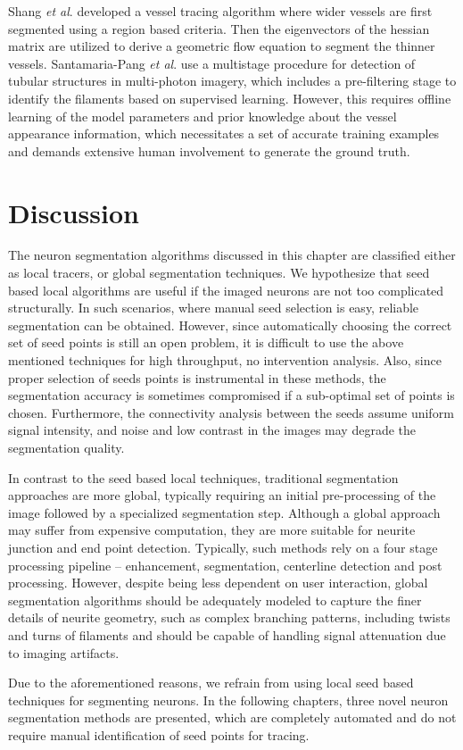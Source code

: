 Shang \textit{et al}. \cite{shang2011vascular} developed a vessel tracing algorithm where wider vessels are first segmented using a region based criteria. Then the eigenvectors of the hessian matrix are utilized to derive a geometric flow equation to segment the thinner vessels. Santamaria-Pang \textit{et al}. \cite{santamaria2007automatic} use a multistage procedure for detection of tubular structures in multi-photon imagery, which includes a pre-filtering stage to identify the filaments based on supervised learning. However, this requires offline learning of the model parameters and prior knowledge about the vessel appearance information, which necessitates a set of accurate training examples and demands extensive human involvement to generate the ground truth.

\section{Discussion}
The neuron segmentation algorithms discussed in this chapter are classified either as local tracers, or global segmentation techniques. We hypothesize that seed based local algorithms are useful if the imaged neurons are not too complicated structurally. In such scenarios, where manual seed selection is easy, reliable segmentation can be obtained. However, since automatically choosing the correct set of seed points is still an open problem, it is difficult to use the above mentioned techniques for high throughput, no intervention analysis. Also, since proper selection of seeds points is instrumental in these methods, the segmentation accuracy is sometimes compromised if a sub-optimal set of points is chosen. Furthermore, the connectivity analysis between the seeds assume uniform signal intensity, and noise and low contrast in the images may degrade the segmentation quality.

In contrast to the seed based local techniques, traditional segmentation approaches are more global, typically requiring an initial pre-processing of the image followed by a specialized segmentation step. Although a global approach may suffer from expensive computation, they are more suitable for neurite junction and end point detection.
Typically, such methods rely on a four stage processing pipeline -- enhancement, segmentation, centerline detection and post processing. However, despite being less dependent on user interaction, global segmentation algorithms should be adequately modeled to capture the finer details of neurite geometry, such as complex branching patterns, including twists and turns of filaments and should be capable of handling signal attenuation due to imaging artifacts.

Due to the aforementioned reasons, we refrain from using local seed based techniques for segmenting neurons. In the following chapters, three novel neuron segmentation methods are presented, which are completely automated and do not require manual identification of seed points for tracing. 